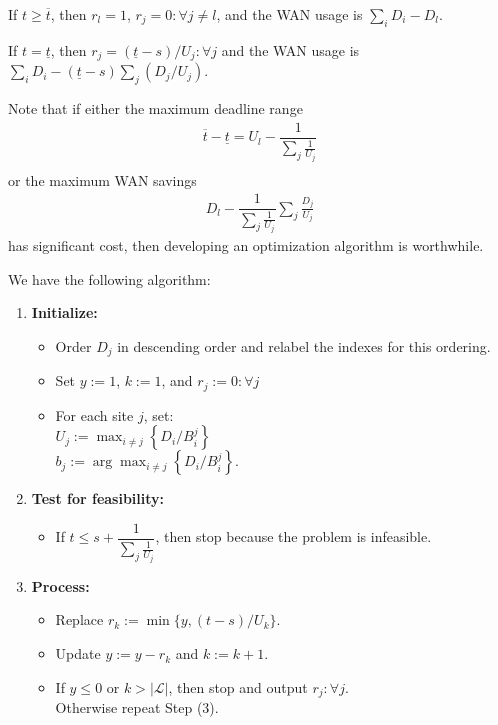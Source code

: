 If $t\geq \overline{t}$, then $r_l=1$, $r_j=0:\forall j\neq l$, and the WAN usage is $\sum_{i}D_i-D_l$.

If $t= \underline{t}$, then $r_j = (\underline{t}-s)/U_j:\forall j$ and the WAN usage is $\sum_{i}D_i-(\underline{t}-s)\sum_{j}(D_j/U_j)$.

Note that if either the maximum deadline range
\begin{align}
	\overline{t}-\underline{t} = U_l - \dfrac{1}{\sum_{j}\frac{1}{U_j}} \\
\end{align}
or the maximum WAN savings
\begin{align}
	D_l-\dfrac{1}{\sum_{j}\frac{1}{U_j}}\sum_{j}\frac{D_j}{U_j}
\end{align}
has significant cost, then developing an optimization algorithm is worthwhile.

We have the following algorithm:
\begin{enumerate}
	\item \textbf{Initialize:}
	\begin{itemize}
		\item Order $D_j$ in descending order and relabel the indexes for this ordering.
		\item Set $y := 1$, $k := 1$, and $r_j := 0:\forall j$
		\item For each site $j$, set:\\
		$U_j := \max_{i\neq j}\left\{D_i/B_i^j\right\}$\\
		$b_j := \arg\max_{i\neq j}\left\{D_i/B_i^j\right\}$.
	\end{itemize}
	\item \textbf{Test for feasibility:}
	\begin{itemize}
		\item If $t\leq s+\dfrac{1}{\sum_{j}\frac{1}{U_j}}$, then stop because the problem is infeasible.
	\end{itemize}
	\item \textbf{Process:}
	\begin{itemize}
		\item Replace $r_k := \min\{y,(t-s)/U_k\}$.
		\item Update $y:= y - r_k$ and $k:=k+1$.
		\item If $y \leq 0$ or $k>|\mathcal{L}|$, then stop and output $r_j:\forall j$.\\
		Otherwise repeat Step (3).
	\end{itemize}
\end{enumerate}